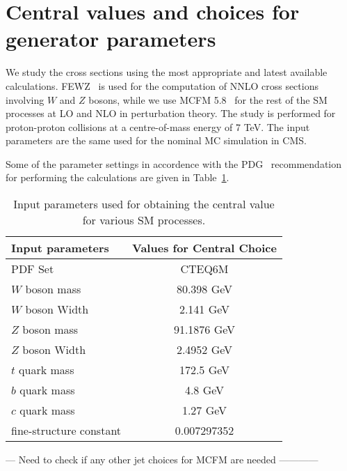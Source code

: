 \section{Central values and choices for generator parameters}
\label{sec:assumptions}

We study the cross sections using the most appropriate and latest available calculations. FEWZ~\cite{fewz} is used 
for the computation of NNLO cross sections involving $W$ and $Z$ bosons, while we use MCFM 5.8~\cite{mcfm} for the rest 
of the SM processes at LO and NLO in perturbation theory. The study is performed for proton-proton collisions at a 
centre-of-mass energy of 7 TeV. The input parameters are the same used
for the nominal MC simulation in CMS.

Some of the parameter settings in accordence with the PDG~\cite{pdg} recommendation for performing the calculations 
are given in Table~\ref{tab:input_params}.

\vspace{0.9mm}
\begin{table}[hbt]
\begin{center}
\renewcommand{\arraystretch}{1.2}
\begin{tabular}{|l|c|}\hline
Input parameters & Values for Central Choice \\ \hline
PDF Set & CTEQ6M \\
$W$ boson mass & 80.398 GeV \\ \hline	
$W$ boson Width & 2.141 GeV \\ \hline	
$Z$ boson mass & 91.1876 GeV \\ \hline	
$Z$ boson Width & 2.4952 GeV \\ \hline	
$t$ quark mass & 172.5 GeV \\ \hline	
$b$ quark mass & 4.8 GeV \\ \hline	
$c$ quark mass & 1.27 GeV \\ \hline	
fine-structure constant &  0.007297352 \\ \hline	
\end{tabular} 
\caption{Input parameters used for obtaining the central value for various SM processes.\label{tab:input_params}}
\end{center}
\end{table}

--- Need to check if any other jet choices for MCFM are needed ------------
